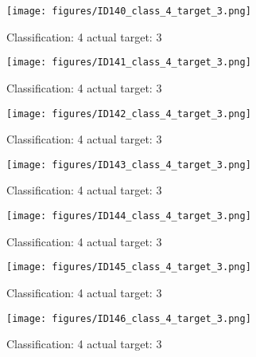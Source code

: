 \begin{figure}[h!]
\begin{center}
\texttt{[image: figures/ID140\_class\_4\_target\_3.png]}
\end{center}
\caption{ Classification: 4 actual target: 3}
\label{fig:ID140_class_4_target_3}
\end{figure}
\begin{figure}[h!]
\begin{center}
\texttt{[image: figures/ID141\_class\_4\_target\_3.png]}
\end{center}
\caption{ Classification: 4 actual target: 3}
\label{fig:ID141_class_4_target_3}
\end{figure}
\begin{figure}[h!]
\begin{center}
\texttt{[image: figures/ID142\_class\_4\_target\_3.png]}
\end{center}
\caption{ Classification: 4 actual target: 3}
\label{fig:ID142_class_4_target_3}
\end{figure}
\begin{figure}[h!]
\begin{center}
\texttt{[image: figures/ID143\_class\_4\_target\_3.png]}
\end{center}
\caption{ Classification: 4 actual target: 3}
\label{fig:ID143_class_4_target_3}
\end{figure}
\begin{figure}[h!]
\begin{center}
\texttt{[image: figures/ID144\_class\_4\_target\_3.png]}
\end{center}
\caption{ Classification: 4 actual target: 3}
\label{fig:ID144_class_4_target_3}
\end{figure}
\begin{figure}[h!]
\begin{center}
\texttt{[image: figures/ID145\_class\_4\_target\_3.png]}
\end{center}
\caption{ Classification: 4 actual target: 3}
\label{fig:ID145_class_4_target_3}
\end{figure}
\begin{figure}[h!]
\begin{center}
\texttt{[image: figures/ID146\_class\_4\_target\_3.png]}
\end{center}
\caption{ Classification: 4 actual target: 3}
\label{fig:ID146_class_4_target_3}
\end{figure}
